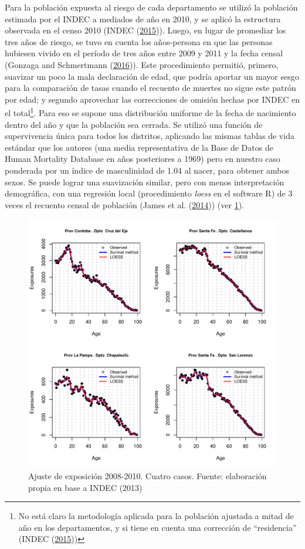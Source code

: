 \documentclass[12pt,]{article}
\begin{document}
Para la población expuesta al riesgo de cada departamento se utilizó la
población estimada por el INDEC a mediados de año en 2010, y se aplicó
la estructura observada en el censo 2010 (INDEC
(\protect\hyperlink{ref-INDEC2015}{2015})). Luego, en lugar de promediar
los tres años de riesgo, se tuvo en cuenta los años-persona en que las
personas hubiesen vivido en el período de tres años entre 2009 y 2011 y
la fecha censal (Gonzaga and Schmertmann
(\protect\hyperlink{ref-Gonzaga_Schmertmann_2016}{2016})). Este
procedimiento permitió, primero, suavizar un poco la mala declaración de
edad, que podría aportar un mayor sesgo para la comparación de tasas
cuando el recuento de muertes no sigue este patrón por edad; y segundo
aprovechar las correcciones de omisión hechas por INDEC en el
total\footnote{No está claro la metodología aplicada para la población
  ajustada a mitad de año en los departamentos, y si tiene en cuenta una
  corrección de ``residencia'' (INDEC
  (\protect\hyperlink{ref-INDEC2015}{2015}))}. Para eso se supone una
distribución uniforme de la fecha de nacimiento dentro del año y que la
población sea cerrada. Se utilizó una función de supervivencia única
para todos los distritos, aplicando las mismas tablas de vida estándar
que los autores (una media representativa de la Base de Datos de Human
Mortality Database en años posteriores a 1969) pero en nuestro caso
ponderada por un índice de masculinidad de 1.04 al nacer, para obtener
ambos sexos. Se puede lograr una suavización similar, pero con menos
interpretación demográfica, con una regresión local (procedimiento
\emph{loess} en el software R) de 3 veces el recuento censal de
población (James et al. (\protect\hyperlink{ref-James2014}{2014})) (ver
\ref{fig:AdjExp}).

\begin{figure}

{\centering \includegraphics[width=0.7\linewidth]{plots/AdjExp} 

}

\caption{Ajuste de exposición 2008-2010. Cuatro casos. Fuente: elaboración propia en base a INDEC (2013)}\label{fig:AdjExp}
\end{figure}
\end{document}
